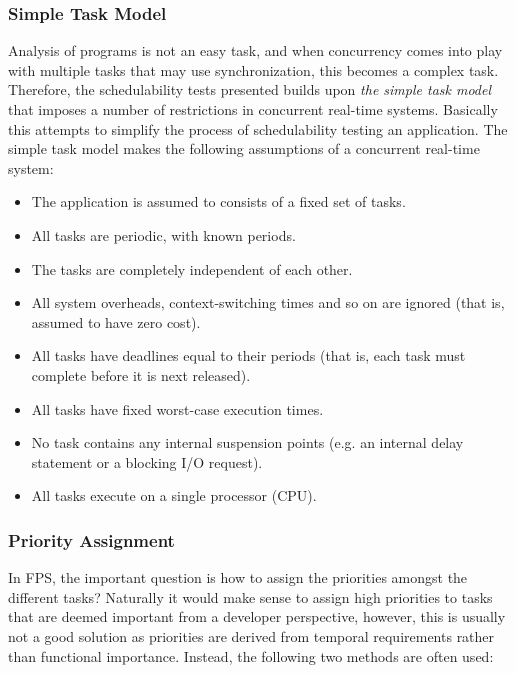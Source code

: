 \subsubsection{Simple Task Model}
Analysis of programs is not an easy task, and when concurrency comes into play with multiple tasks that may use synchronization, this becomes a complex task. Therefore, the schedulability tests presented builds upon \textit{the simple task model} that imposes a number of restrictions in concurrent real-time systems. Basically this attempts to simplify the process of schedulability testing an application. The simple task model makes the following assumptions of a concurrent real-time system:
\begin{itemize}
	\item The application is assumed to consists of a fixed set of tasks.
	\item All tasks are periodic, with known periods.
	\item The tasks are completely independent of each other.
	\item All system overheads, context-switching times and so on are ignored (that is, assumed to have zero cost).
	\item All tasks have deadlines equal to their periods (that is, each task must complete before it is next released).
	\item All tasks have fixed worst-case execution times.
	\item No task contains any internal suspension points (e.g. an internal delay statement or a blocking I/O request).
	\item All tasks execute on a single processor (CPU).
\end{itemize}

\subsubsection{Priority Assignment}
In FPS, the important question is how to assign the priorities amongst the different tasks? Naturally it would make sense to assign high priorities to tasks that are deemed important from a developer perspective, however, this is usually not a good solution as priorities are derived from temporal requirements rather than functional importance. Instead, the following two methods are often used:

